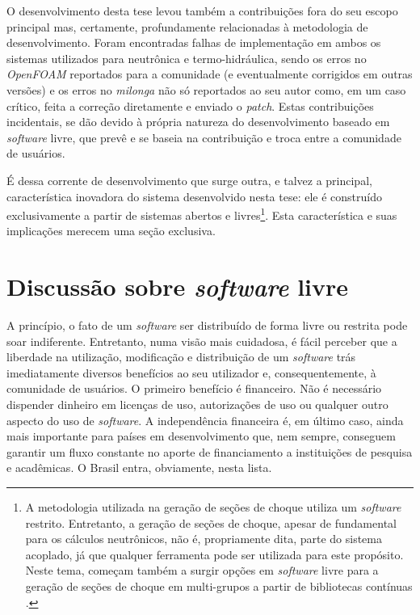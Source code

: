 O desenvolvimento desta tese levou também a contribuições fora do seu escopo principal mas,
certamente, profundamente relacionadas à metodologia de desenvolvimento. Foram encontradas
falhas de implementação em ambos os sistemas utilizados para neutrônica e termo-hidráulica,
sendo os erros no \textit{OpenFOAM} reportados para a comunidade (e eventualmente
corrigidos em outras versões) e os erros no \textit{milonga} não só reportados ao seu autor como,
em um caso crítico, feita a correção diretamente e enviado o \textit{patch}. Estas contribuições
incidentais, se dão devido à própria natureza do desenvolvimento baseado
em \textit{software} livre, que prevê e se baseia na contribuição e troca entre a comunidade
de usuários.

É dessa corrente de desenvolvimento que surge outra, e talvez a principal, característica inovadora
do sistema desenvolvido nesta tese: ele é construído exclusivamente a partir
de sistemas abertos e livres\footnote{A metodologia utilizada
  na geração de seções de choque utiliza um \textit{software} restrito. Entretanto, a geração
  de seções de choque, apesar de fundamental para os cálculos neutrônicos, não é, propriamente dita,
  parte do sistema acoplado, já que qualquer ferramenta pode ser utilizada para este propósito. Neste tema, começam também a surgir opções em \textit{software} livre
  para a geração de seções de choque em multi-grupos a partir de bibliotecas contínuas \cite{pyne2014}.}.
Esta característica e suas implicações merecem uma seção exclusiva.


\section{Discussão sobre \textit{software} livre}

A princípio, o fato de um \textit{software} ser distribuído de forma livre ou restrita pode soar indiferente.
Entretanto, numa visão mais cuidadosa, é fácil
perceber que a liberdade na utilização, modificação e distribuição de um \textit{software} trás imediatamente
diversos benefícios ao seu utilizador e, consequentemente, à comunidade de usuários. O primeiro
benefício é financeiro. Não é necessário dispender dinheiro em licenças de uso, autorizações de uso ou
qualquer outro aspecto do uso de \textit{software}. A independência financeira é, em último caso,
ainda mais importante para países em desenvolvimento que, nem sempre, conseguem garantir um fluxo constante
no aporte de financiamento a instituições de pesquisa e acadêmicas. O Brasil entra, obviamente, nesta lista.

